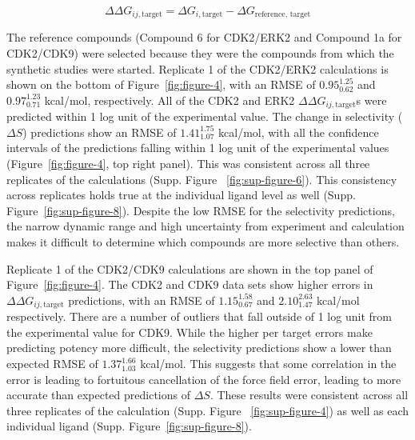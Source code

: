 \documentclass[phd,tocprelim]{cornell}
\begin{document}
\begin{equation}
\Delta \Delta G_{ij, \text{target}} = \Delta G_{i, \text{target}} - \Delta G_{\text{reference, target}}
\end{equation}

The reference compounds (Compound 6 for CDK2/ERK2 and Compound 1a for CDK2/CDK9) were selected because they were the compounds from which the synthetic studies were started. Replicate 1 of the CDK2/ERK2 calculations is shown on the bottom of Figure~\ref{fig:figure-4}, with an RMSE of $0.95^{1.25}_{0.62}$ and $0.97^{1.23}_{0.71}$ kcal/mol, respectively. All of the CDK2 and ERK2 $\Delta \Delta G_{ij, \text{target}}$s were predicted within 1 log unit of the experimental value. The change in selectivity ($\Delta S$) predictions show an RMSE of $1.41^{1.75}_{1.07}$ kcal/mol, with all the confidence intervals of the predictions falling within 1 log unit of the experimental values (Figure~\ref{fig:figure-4}, top right panel). This was consistent across all three replicates of the calculations (Supp. Figure ~\ref{fig:sup-figure-6}). This consistency across replicates holds true at the individual ligand level as well (Supp. Figure~\ref{fig:sup-figure-8}). Despite the low RMSE for the selectivity predictions, the narrow dynamic range and high uncertainty from experiment and calculation makes it difficult to determine which compounds are more selective than others. 

Replicate 1 of the CDK2/CDK9 calculations are shown in the top panel of Figure~\ref{fig:figure-4}. The CDK2 and CDK9 data sets show higher errors in $\Delta \Delta G_{ij, \text{target}}$ predictions, with an RMSE of $1.15^{1.58}_{0.67}$ and $2.10^{2.63}_{1.47}$ kcal/mol respectively. There are a number of outliers that fall outside of 1 log unit from the experimental value for CDK9. While the higher per target errors make predicting potency more difficult, the selectivity predictions show a lower than expected RMSE of $1.37^{1.66}_{1.03}$ kcal/mol. This suggests that some correlation in the error is leading to fortuitous cancellation of the force field error, leading to more accurate than expected predictions of $\Delta S$. These results were consistent across all three replicates of the calculation (Supp. Figure ~\ref{fig:sup-figure-4}) as well as each individual ligand (Supp. Figure~\ref{fig:sup-figure-8}). 
\end{document}
